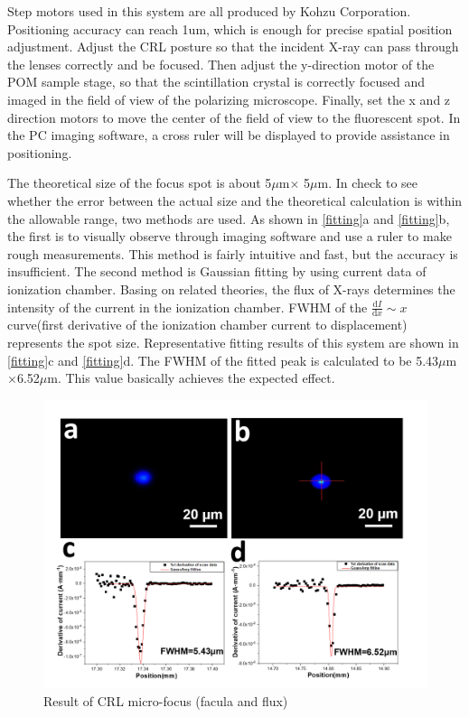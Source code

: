 \documentclass{Head}
\begin{document}
Step motors used in this system are all produced by Kohzu Corporation.
Positioning accuracy can reach 1um, which is enough for precise spatial position adjustment.
Adjust the CRL posture so that the incident X-ray can pass through the lenses correctly and be focused.
Then adjust the y-direction motor of the POM sample stage, so that the scintillation crystal is correctly focused and imaged in the field of view of the polarizing microscope.
Finally, set the x and z direction motors to move the center of the field of view to the fluorescent spot.
In the PC imaging software, a cross ruler will be displayed to provide assistance in positioning.



The theoretical size of the focus spot is about 5$\mu$m$\times$ 5$\mu$m.
In check to see whether the error between the actual size and the theoretical calculation is within the allowable range, two methods are used.
As shown in \autoref{fitting}a and \autoref{fitting}b, the first is to visually observe through imaging software and use a ruler to make rough measurements.
This method is fairly intuitive and fast, but the accuracy is insufficient.
The second method is Gaussian fitting by using current data of ionization chamber.
Basing on related theories, the flux of X-rays determines the intensity of the current in the ionization chamber.
FWHM of the $\frac{\mathrm{d}I}{\mathrm{d}x}\sim x$ curve(first derivative of the ionization chamber current to displacement) represents the spot size.
Representative fitting results of this system are shown in \autoref{fitting}c and \autoref{fitting}d.
The FWHM of the fitted peak is calculated to be 5.43$\mu$m$\times$6.52$\mu$m.
This value basically achieves the expected effect.
\begin{figure}
    \centering
    \includegraphics[scale=0.5]{Figures/Fig6CRLmicrofocus.png}
    \caption{Result of CRL micro-focus (facula and flux)}
    \label{fitting}
\end{figure}
\end{document}
